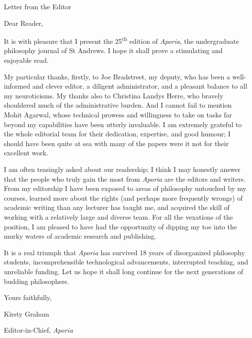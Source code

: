 \vspace*{\credgap}
{\noindent\LARGE\sc Letter from the Editor}
\vspace{\credgap}

\vspace{\ackgap}\noindent
Dear Reader,

\vspace{\credgap}\noindent
It is with pleasure that I present the 25\textsuperscript{th} edition
of \emph{Aporia}, the undergraduate philosophy journal of St Andrews.
I hope it shall prove a stimulating and enjoyable read.

My particular thanks, firstly, to Joe Bradstreet, my deputy, who has
been a well-informed and clever editor, a diligent administrator, and
a pleasant balance to all my neuroticisms. My thanks also to Christina
Landys Herre, who bravely shouldered much of the administrative
burden.  And I cannot fail to mention Mohit Agarwal, whose technical
prowess and willingness to take on tasks far beyond my capabilities
have been utterly invaluable. I am extremely grateful to the whole
editorial team for their dedication, expertise, and good humour; I
should have been quite at sea with many of the papers were it not for
their excellent work.

I am often teasingly asked about our readership; I think I may honestly
answer that the people who truly gain the most from \emph{Aporia} are
the editors and writers. From my editorship I have been exposed to areas
of philosophy untouched by my courses, learned more about the rights
(and perhaps more frequently wrongs) of academic writing than any
lecturer has taught me, and acquired the skill of working with a
relatively large and diverse team. For all the vexations of the
position, I am pleased to have had the opportunity of dipping my toe
into the murky waters of academic research and publishing.

It is a real triumph that \emph{Aporia} has survived 18 years of
disorganized philosophy students, incomprehensible technological
advancements, interrupted teaching, and unreliable funding. Let us hope
it shall long continue for the next generations of budding philosophers.

\vspace{\credgap}\noindent
Yours faithfully,

\vspace{\ackgap}\noindent
Kirsty Graham

\noindent
Editor-in-Chief, \emph{Aporia}
